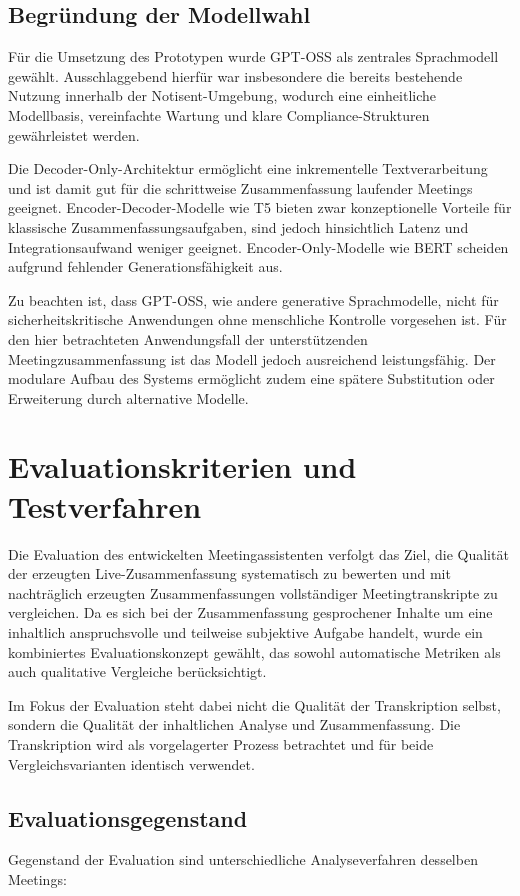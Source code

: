 \subsection{Begründung der Modellwahl}
Für die Umsetzung des Prototypen wurde GPT-OSS als zentrales Sprachmodell gewählt. Ausschlaggebend hierfür war insbesondere die bereits bestehende Nutzung innerhalb der Notisent-Umgebung, wodurch eine einheitliche Modellbasis, vereinfachte Wartung und klare Compliance-Strukturen gewährleistet werden. 

Die Decoder-Only-Architektur ermöglicht eine inkrementelle Textverarbeitung und ist damit gut für die schrittweise Zusammenfassung laufender Meetings geeignet. Encoder-Decoder-Modelle wie T5 bieten zwar konzeptionelle Vorteile für klassische Zusammenfassungsaufgaben, sind jedoch hinsichtlich Latenz und Integrationsaufwand weniger geeignet. Encoder-Only-Modelle wie BERT scheiden aufgrund fehlender Generationsfähigkeit aus. 

Zu beachten ist, dass GPT-OSS, wie andere generative Sprachmodelle, nicht für sicherheitskritische Anwendungen ohne menschliche Kontrolle vorgesehen ist. Für den hier betrachteten Anwendungsfall der unterstützenden Meetingzusammenfassung ist das Modell jedoch ausreichend leistungsfähig. Der modulare Aufbau des Systems ermöglicht zudem eine spätere Substitution oder Erweiterung durch alternative Modelle. 

\section{Evaluationskriterien und Testverfahren}
Die Evaluation des entwickelten Meetingassistenten verfolgt das Ziel, die Qualität der erzeugten Live-Zusammenfassung systematisch zu bewerten und mit nachträglich erzeugten Zusammenfassungen vollständiger Meetingtranskripte zu vergleichen. Da es sich bei der Zusammenfassung gesprochener Inhalte um eine inhaltlich anspruchsvolle und teilweise subjektive Aufgabe handelt, wurde ein kombiniertes Evaluationskonzept gewählt, das sowohl automatische Metriken als auch qualitative Vergleiche berücksichtigt. 

Im Fokus der Evaluation steht dabei nicht die Qualität der Transkription selbst, sondern die Qualität der inhaltlichen Analyse und Zusammenfassung. Die Transkription wird als vorgelagerter Prozess betrachtet und für beide Vergleichsvarianten identisch verwendet. 

\subsection{Evaluationsgegenstand}
Gegenstand der Evaluation sind unterschiedliche Analyseverfahren desselben Meetings: 

